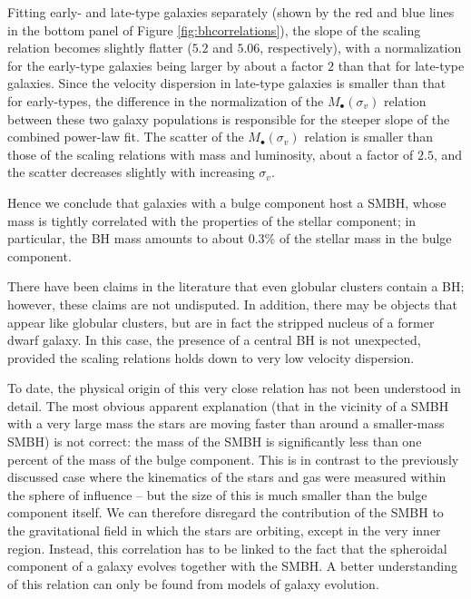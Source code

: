 \documentclass[a4paper,10pt]{article}
\begin{document}
{\noindent}Fitting early- and late-type galaxies separately (shown by the red and blue lines in the bottom panel of Figure \ref{fig:bhcorrelations}), the slope of the scaling relation becomes slightly flatter ($5.2$ and $5.06$, respectively), with a normalization for the early-type galaxies being larger by about a factor $2$ than that for late-type galaxies. Since the velocity dispersion in late-type galaxies is smaller than that for early-types, the difference in the normalization of the $M_\bullet(\sigma_v)$ relation between these two galaxy populations is responsible for the steeper slope of the combined power-law fit. The scatter of the $M_\bullet(\sigma_v)$ relation is smaller than those of the scaling relations with mass and luminosity, about a factor of $2.5$, and the scatter decreases slightly with increasing  $\sigma_v$.

{\noindent}Hence we conclude that galaxies with a bulge component host a SMBH, whose mass is tightly correlated with the properties of the stellar component; in particular, the BH mass amounts to about 0.3\% of the stellar mass in the bulge component.

{\noindent}There have been claims in the literature that even globular clusters contain a BH; however, these claims are not undisputed. In addition, there may be objects that appear like globular clusters, but are in fact the stripped nucleus of a former dwarf galaxy. In this case, the presence of a central BH is not unexpected, provided the scaling relations holds down to very low velocity dispersion.

{\noindent}To date, the physical origin of this very close relation has not been understood in detail. The most obvious apparent explanation (that in the vicinity of a SMBH with a very large mass the stars are moving faster than around a smaller-mass SMBH) is not correct: the mass of the SMBH is significantly less than one percent of the mass of the bulge component. This is in contrast to the previously discussed case where the kinematics of the stars and gas were measured within the sphere of influence -- but the size of this is much smaller than the bulge component itself. We can therefore disregard the contribution of the SMBH to the gravitational field in which the stars are orbiting, except in the very inner region. Instead, this correlation has to be linked to the fact that the spheroidal component of a galaxy evolves together with the SMBH. A better understanding of this relation can only be found from models of galaxy evolution.
\end{document}
